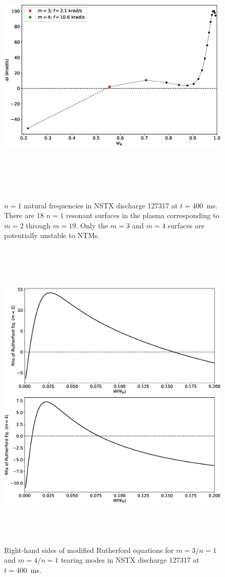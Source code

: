 \documentclass[12pt,prb,aps]{revtex4-1}
\begin{document}
\begin{figure}
\centerline{\includegraphics[height=5in]{Fig2.eps}}
\caption{$n=1$ natural frequencies in NSTX discharge 127317 at $t=400$\, ms. There are 18 $n=1$ resonant surfaces in the plasma corresponding to $m=2$ through $m=19$. Only the $m=3$ and $m=4$ surfaces are potentially
unstable to NTMs.}\label{fig2}
\end{figure}

\begin{figure}
\centerline{\includegraphics[height=6in]{Fig3.eps}}
\caption{Right-hand sides of modified Rutherford equations for $m=3/n=1$ and $m=4/n=1$ tearing modes in NSTX discharge 127317 at $t=400$\, ms.}\label{fig3}
\end{figure}
\end{document}
